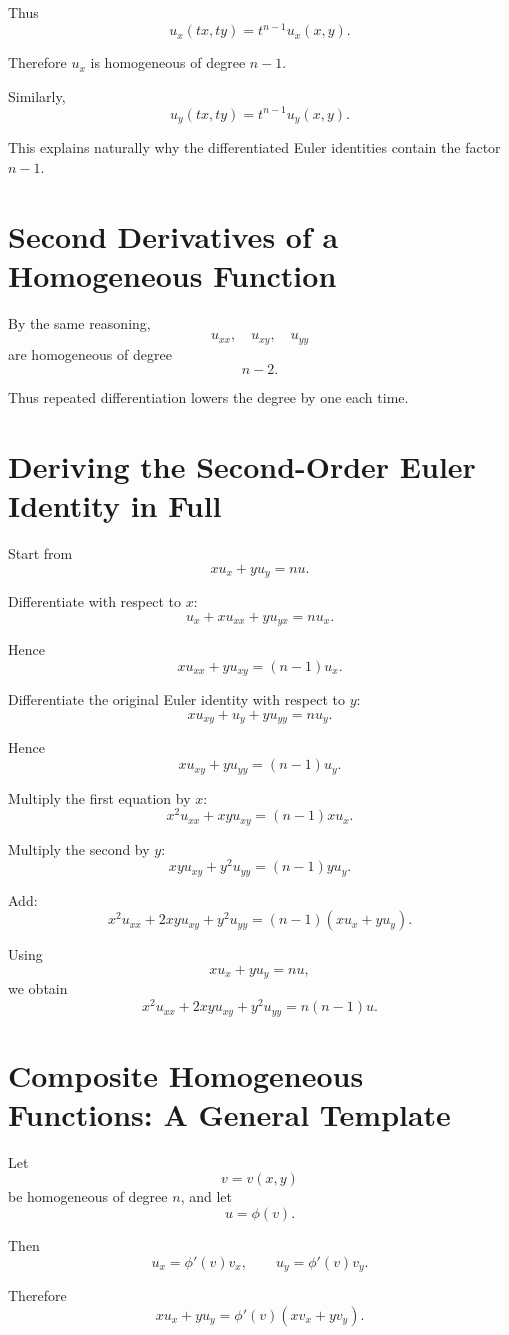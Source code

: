 \documentclass[11pt,oneside]{book}
\theoremstyle{studentthm}
\theoremstyle{definition}
\begin{document}
Thus
\[
u_x(tx,ty)
=
t^{n-1}u_x(x,y).
\]

Therefore \(u_x\) is homogeneous of degree \(n-1\).

Similarly,
\[
u_y(tx,ty)
=
t^{n-1}u_y(x,y).
\]

This explains naturally why the differentiated Euler identities contain
the factor \(n-1\).

\section{Second Derivatives of a Homogeneous Function}

By the same reasoning,
\[
u_{xx},\quad u_{xy},\quad u_{yy}
\]
are homogeneous of degree
\[
n-2.
\]

Thus repeated differentiation lowers the degree by one each time.

\section{Deriving the Second-Order Euler Identity in Full}

Start from
\[
xu_x+yu_y=nu.
\]

Differentiate with respect to \(x\):
\[
u_x+xu_{xx}+yu_{yx}=nu_x.
\]

Hence
\[
xu_{xx}+yu_{xy}
=
(n-1)u_x.
\]

Differentiate the original Euler identity with respect to \(y\):
\[
xu_{xy}+u_y+yu_{yy}=nu_y.
\]

Hence
\[
xu_{xy}+yu_{yy}
=
(n-1)u_y.
\]

Multiply the first equation by \(x\):
\[
x^2u_{xx}+xyu_{xy}
=
(n-1)xu_x.
\]

Multiply the second by \(y\):
\[
xyu_{xy}+y^2u_{yy}
=
(n-1)yu_y.
\]

Add:
\[
x^2u_{xx}
+
2xyu_{xy}
+
y^2u_{yy}
=
(n-1)(xu_x+yu_y).
\]

Using
\[
xu_x+yu_y=nu,
\]
we obtain
\[
x^2u_{xx}
+
2xyu_{xy}
+
y^2u_{yy}
=
n(n-1)u.
\]

\section{Composite Homogeneous Functions: A General Template}

Let
\[
v=v(x,y)
\]
be homogeneous of degree \(n\), and let
\[
u=\phi(v).
\]

Then
\[
u_x=\phi'(v)v_x,
\qquad
u_y=\phi'(v)v_y.
\]

Therefore
\[
xu_x+yu_y
=
\phi'(v)(xv_x+yv_y).
\]
\end{document}
